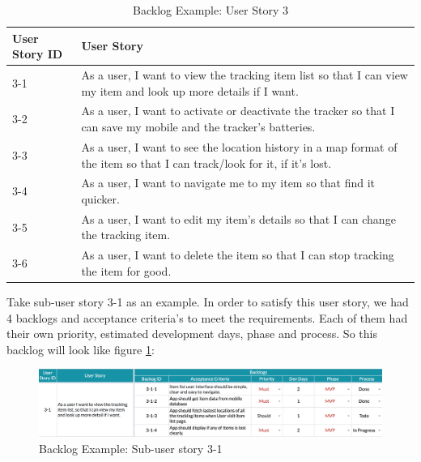 \documentclass[12pt,a4paper]{article}
\begin{document}
          \begin{table}[H]
            \centering
              \begin{tabularx}{\textwidth}{l X}
                \hline
                 User Story ID & User Story \\ \hline
                 3-1 & As a user, I want to view the tracking item list so that I can view my item and look up more details if I want. \\
                 3-2 & As a user, I want to activate or deactivate the tracker so that I can save my mobile and the tracker's batteries. \\
                 3-3 & As a user, I want to see the location history in a map format of the item so that I can track/look for it, if it's lost. \\
                 3-4 & As a user, I want to navigate me to my item so that find it quicker. \\
                 3-5 & As a user, I want to edit my item's details so that I can change the tracking item. \\
                 3-6 & As a user, I want to delete the item so that I can stop tracking the item for good. \\
                \hline
              \end{tabularx}
              \caption[Table caption text]{Backlog Example: User Story 3}
              \label{table:Backlog Example: User Story 3}
          \end{table}   
          
          Take sub-user story 3-1 as an example. In order to satisfy this user story, we had 4 backlogs and acceptance criteria's to meet the requirements. Each of them had their own priority, estimated development days, phase and process. So this backlog will look like figure \ref{fig:Backlog Example: Sub-user story 3-1}:
          
          \begin{figure}[H]
            \centering
            \includegraphics[width=1\textwidth]{../assets/development-records-backlog-example.png}
            \caption{Backlog Example: Sub-user story 3-1}
            \label{fig:Backlog Example: Sub-user story 3-1}
          \end{figure}
          
\end{document}

